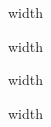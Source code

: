 

\begin{minipage}{\linewidth}




\vrule height.5pt depth 0pt width\linewidth
\newline
\fontsize{8}{8.7}\selectfont
\begin{wrapfigure}[14]{l}[0pt]{25mm}
\end{wrapfigure}
\authorone

\end{minipage}





\begin{minipage}{\linewidth}

\vrule height.5pt depth 0pt width\linewidth
\newline
\fontsize{8}{8.7}\selectfont
\begin{wrapfigure}[14]{l}[0pt]{25mm}
\end{wrapfigure}
\authortwo

\end{minipage}






\begin{minipage}{\linewidth}

\vrule height.5pt depth 0pt width\linewidth
\newline
\fontsize{8}{8.7}\selectfont
\begin{wrapfigure}[14]{l}[0pt]{25mm}
\end{wrapfigure}
\authorthree

\end{minipage}




\begin{minipage}{\linewidth}

\vrule height.5pt depth 0pt width\linewidth
\newline
\fontsize{8}{8.7}\selectfont
\begin{wrapfigure}[14]{l}[0pt]{25mm}
\end{wrapfigure}
\authorfour

\end{minipage}

